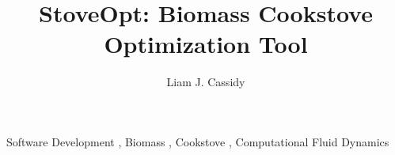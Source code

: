 \documentclass[3p,times,twocolumn]{elsarticle}
\begin{document}
\begin{frontmatter}



\dochead{}

\title{StoveOpt: Biomass Cookstove Optimization Tool}


\author{Liam J. Cassidy}

\address{2000 SW Monroe Ave, 342 Rogers Hall, Covallis, OR 97331}


\begin{abstract}
\end{abstract}

\begin{keyword}


Software Development \sep%
Biomass \sep%
Cookstove \sep%
Computational Fluid Dynamics
\end{keyword}


\end{frontmatter}


\end{document}
